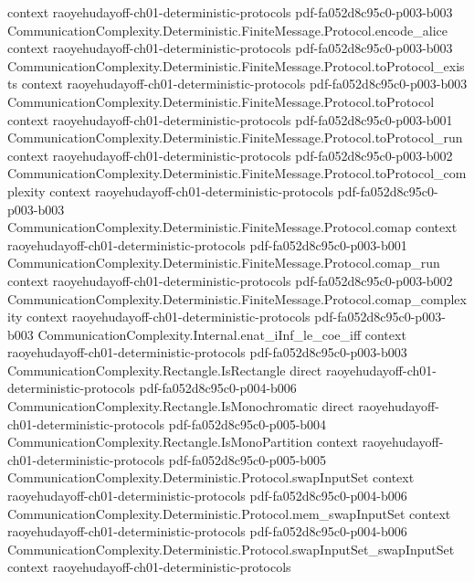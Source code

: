 \begin{theorem}
  {context}
  {raoyehudayoff-ch01-deterministic-protocols}
  {pdf-fa052d8c95c0-p003-b003}
\proofstep
  {CommunicationComplexity.Deterministic.FiniteMessage.Protocol.encode_alice}
  {context}
  {raoyehudayoff-ch01-deterministic-protocols}
  {pdf-fa052d8c95c0-p003-b003}
\proofstep
  {CommunicationComplexity.Deterministic.FiniteMessage.Protocol.toProtocol_exists}
  {context}
  {raoyehudayoff-ch01-deterministic-protocols}
  {pdf-fa052d8c95c0-p003-b003}
\proofstep
  {CommunicationComplexity.Deterministic.FiniteMessage.Protocol.toProtocol}
  {context}
  {raoyehudayoff-ch01-deterministic-protocols}
  {pdf-fa052d8c95c0-p003-b001}
\proofstep
  {CommunicationComplexity.Deterministic.FiniteMessage.Protocol.toProtocol_run}
  {context}
  {raoyehudayoff-ch01-deterministic-protocols}
  {pdf-fa052d8c95c0-p003-b002}
\proofstep
  {CommunicationComplexity.Deterministic.FiniteMessage.Protocol.toProtocol_complexity}
  {context}
  {raoyehudayoff-ch01-deterministic-protocols}
  {pdf-fa052d8c95c0-p003-b003}
\proofstep
  {CommunicationComplexity.Deterministic.FiniteMessage.Protocol.comap}
  {context}
  {raoyehudayoff-ch01-deterministic-protocols}
  {pdf-fa052d8c95c0-p003-b001}
\proofstep
  {CommunicationComplexity.Deterministic.FiniteMessage.Protocol.comap_run}
  {context}
  {raoyehudayoff-ch01-deterministic-protocols}
  {pdf-fa052d8c95c0-p003-b002}
\proofstep
  {CommunicationComplexity.Deterministic.FiniteMessage.Protocol.comap_complexity}
  {context}
  {raoyehudayoff-ch01-deterministic-protocols}
  {pdf-fa052d8c95c0-p003-b003}
\proofstep
  {CommunicationComplexity.Internal.enat_iInf_le_coe_iff}
  {context}
  {raoyehudayoff-ch01-deterministic-protocols}
  {pdf-fa052d8c95c0-p003-b003}
\proofstep
  {CommunicationComplexity.Rectangle.IsRectangle}
  {direct}
  {raoyehudayoff-ch01-deterministic-protocols}
  {pdf-fa052d8c95c0-p004-b006}
\proofstep
  {CommunicationComplexity.Rectangle.IsMonochromatic}
  {direct}
  {raoyehudayoff-ch01-deterministic-protocols}
  {pdf-fa052d8c95c0-p005-b004}
\proofstep
  {CommunicationComplexity.Rectangle.IsMonoPartition}
  {context}
  {raoyehudayoff-ch01-deterministic-protocols}
  {pdf-fa052d8c95c0-p005-b005}
\proofstep
  {CommunicationComplexity.Deterministic.Protocol.swapInputSet}
  {context}
  {raoyehudayoff-ch01-deterministic-protocols}
  {pdf-fa052d8c95c0-p004-b006}
\proofstep
  {CommunicationComplexity.Deterministic.Protocol.mem_swapInputSet}
  {context}
  {raoyehudayoff-ch01-deterministic-protocols}
  {pdf-fa052d8c95c0-p004-b006}
\proofstep
  {CommunicationComplexity.Deterministic.Protocol.swapInputSet_swapInputSet}
  {context}
  {raoyehudayoff-ch01-deterministic-protocols}

\end{theorem}
